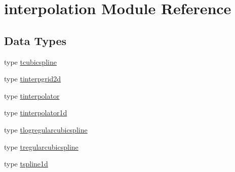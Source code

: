 \hypertarget{namespaceinterpolation}{}\section{interpolation Module Reference}
\label{namespaceinterpolation}
\subsection*{Data Types}
\begin{DoxyCompactItemize}
\item 
type \mbox{\hyperlink{structinterpolation_1_1tcubicspline}{tcubicspline}}
\item 
type \mbox{\hyperlink{structinterpolation_1_1tinterpgrid2d}{tinterpgrid2d}}
\item 
type \mbox{\hyperlink{structinterpolation_1_1tinterpolator}{tinterpolator}}
\item 
type \mbox{\hyperlink{structinterpolation_1_1tinterpolator1d}{tinterpolator1d}}
\item 
type \mbox{\hyperlink{structinterpolation_1_1tlogregularcubicspline}{tlogregularcubicspline}}
\item 
type \mbox{\hyperlink{structinterpolation_1_1tregularcubicspline}{tregularcubicspline}}
\item 
type \mbox{\hyperlink{structinterpolation_1_1tspline1d}{tspline1d}}
\end{DoxyCompactItemize}
